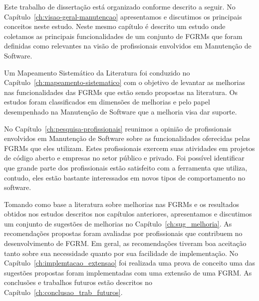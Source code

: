 Este trabalho de dissertação está organizado conforme descrito a seguir. No
Capítulo~\ref{ch:visao-geral-manutencao} apresentamos e discutimos os principais
conceitos neste estudo. Neste mesmo capítulo é descrito um estudo onde coletamos
as principais funcionalidades de um conjunto de FGRMs que foram definidas como
relevantes na visão de profissionais envolvidos em Manutenção de Software.

Um Mapeamento Sistemático da Literatura foi conduzido no
Capítulo~\ref{ch:mapeamento-sistematico} com o objetivo de levantar as melhorias
nas funcionalidades das FGRMs que estão sendo propostas na literatura. Os
estudos foram classificados em dimensões de melhorias e pelo papel desempenhado
na Manutenção de Software que a melhoria visa dar suporte.

No Capítulo~\ref{ch:pesquisa-profissionais} reunimos a opinião de profissionais
envolvidos em Manutenção de Software sobre as funcionalidades oferecidas pelas
FGRMs que eles utilizam. Estes profissionais exercem suas atividades em projetos
de código aberto e empresas no setor público e privado. Foi possível identificar
que grande parte dos profissionais estão satisfeito com a ferramenta que
utiliza, contudo, eles estão bastante interessados em novos tipos de
comportamento no software.

Tomando como base a literatura sobre melhorias nas FGRMs e os resultados obtidos
nos estudos descritos nos capítulos anteriores, apresentamos e discutimos um
conjunto de sugestões de melhorias no Capítulo~\ref{ch:sug_melhoria}. As
recomendações propostas foram avaliadas por profissionais que contribuem no
desenvolvimento de FGRM\@. Em geral, as recomendações tiveram boa aceitação
tanto sobre sua necessidade quanto por sua facilidade de implementação.  No
Capítulo~\ref{ch:implemtacao_extensao} foi realizada uma prova de conceito uma
das sugestões propostas foram implementadas com uma extensão de uma FGRM\@. As
conclusões e trabalhos futuros estão descritos no
Capítulo~\ref{ch:conclusao_trab_futuros}.
